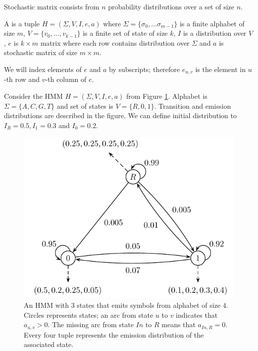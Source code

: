 \begin{note}
Stochastic matrix consists from $n$ probability distributions over a set of size $n$.
\end{note}

\begin{definition}\label{DEF:HMM}
A  is a tuple $H=(\Sigma,V,I,e,a)$ where
$\Sigma=\{\sigma_0,\dots\sigma_{m-1}\}$ is a finite alphabet of size $m$,
$V=\{v_0,\dots,v_{k-1}\}$ is a finite set of state of size $k$, $I$ is
a distribution over $V$, $e$ is $k\times m$ matrix where each row contains
distribution over $\Sigma$ and $a$ is stochastic matrix of size $m\times m$.

We will index elements of $e$ and $a$ by subscripts; therefore $e_{u,v}$ is
the element in $u$-th row and $v$-th column of $e$.  

\end{definition}

\begin{example}\label{EXAMPLE:EXAMPLEHMM} Consider the HMM $H=(\Sigma,V,I,e,a)$ from Figure
\ref{FIGURE:EXAMPLEHMM}.  Alphabet is $\Sigma=\{A,C,G,T\}$ and set of states is
$V=\{R,0,1\}$.  Transition and emission distributions are described in the figure.
We can define initial distribution to $I_R=0.5, I_1=0.3$ and $I_{0}=0.2$.
\end{example}

\begin{figure}
\begin{center}
\includegraphics{../figures/exampleHMM.pdf}
\end{center}
\caption[Example of simple Hidden Markov Model]{
An HMM with $3$ states
that emits symbols from alphabet of size $4$.  Circles represents states; an arc
from state $u$ to $v$ indicates that $a_{u,v}>0$. The missing arc from state
$In$ to $R$ means that $a_{In,R}=0$. Every four tuple represents the emission distribution of the associated state.
}\label{FIGURE:EXAMPLEHMM} 
\end{figure}


